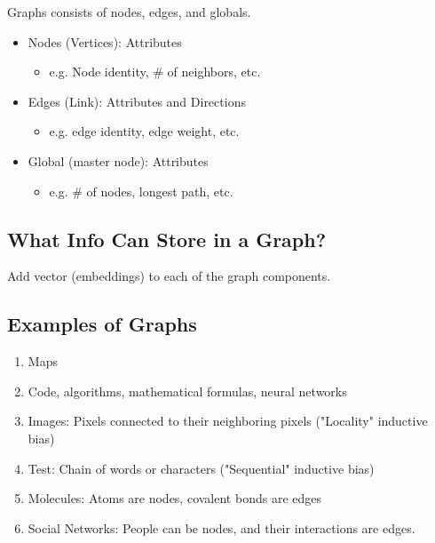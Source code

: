 \begin{definition} Graphs consists of nodes, edges, and globals. 
    \begin{itemize}
        \item Nodes (Vertices): Attributes 
        \begin{itemize}
            \item e.g. Node identity, \# of neighbors, etc.
        \end{itemize}
        \item Edges (Link): Attributes and Directions
        \begin{itemize}
            \item e.g. edge identity, edge weight, etc.
        \end{itemize}
        \item Global (master node): Attributes
        \begin{itemize}
            \item e.g. \# of nodes, longest path, etc.
        \end{itemize}
    \end{itemize}
\end{definition}

\subsection{What Info Can Store in a Graph?}
\begin{notes} Add vector (embeddings) to each of the graph components.
\end{notes}
\newpage

\subsection{Examples of Graphs}
\begin{example}
    \begin{enumerate}
        \item Maps
        \item Code, algorithms, mathematical formulas, neural networks 
        \item Images: Pixels connected to their neighboring pixels ("Locality" inductive bias)
        \item Test: Chain of words or characters ("Sequential" inductive bias)
        \item Molecules: Atoms are nodes, covalent bonds are edges
        \item Social Networks: People can be nodes, and their interactions are edges. 
    \end{enumerate}
\end{example}